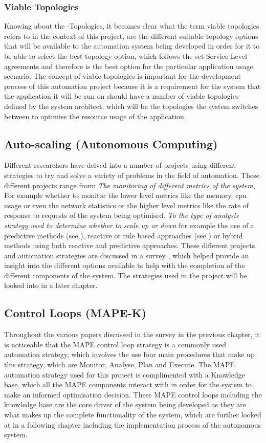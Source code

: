 \subsubsection{Viable Topologies}
Knowing about the \textalpha-Topologies, it becomes clear what the term viable topologies refers to in the context of this project, are the different suitable topology options that will be available to the automation system being developed in order for it to be able to select the best topology option, which follows the set Service Level agreements and therefore is the best option for the particular application usage scenario. The concept of viable topologies is important for the development process of this automation project because it is a requirement for the system that the application it will be run on should have a number of viable topologies defined by the system architect, which will be the topologies the system switches between to optimise the resource usage of the application.

\subsection{Auto-scaling (Autonomous Computing)}
Different researchers have delved into a number of projects using different strategies to try and solve a variety of problems in the field of automation. These different projects range from: \textit{The monitoring of different metrics of the system}, For example whether to monitor the lower level metrics like the memory, cpu usage or even the network statistics or the higher level metrics like the rate of response to requests of the system being optimised. \textit{To the type of analysis strategy used to determine whether to scale up or down} for example the use of a predictive methods (see \cite{loff2014vadara}), reactive or rule based approaches (see \cite{amazon}) or hybrid methods using both reactive and predictive approaches. These different projects and automation strategies are discussed in a survey \cite{qu2018auto}, which helped provide an insight into the different options available to help with the completion of the different components of the system. The strategies used in the project will be looked into in a later chapter.

\subsection{Control Loops (MAPE-K)}
Throughout the various papers discussed in the survey \cite{qu2018auto} in the previous chapter, it is noticeable that the MAPE control loop strategy is a commonly used automation strategy, which involves the use four main procedures that make up this strategy, which are Monitor, Analyse, Plan and Execute. The MAPE automation strategy \cite{kephart2003vision} used for this project is complimented with a Knowledge base, which all the MAPE components interact with in order for the system to make an informed optimisation decision. These MAPE control loops including the knowledge base are the core driver of the system being developed as they are what makes up the complete functionality of the system, which are further looked at in a following chapter including the implementation process of the autonomous system.

